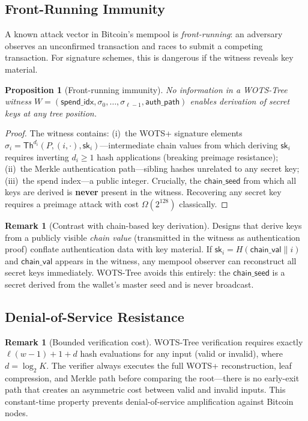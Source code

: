 \documentclass[11pt,a4paper]{article}
\newtheorem{proposition}[theorem]{Proposition}
\theoremstyle{definition}
\newtheorem{remark}[theorem]{Remark}
\begin{document}
\subsection{Front-Running Immunity}
\label{sec:front-running}

A known attack vector in Bitcoin's mempool is \emph{front-running}: an adversary observes an unconfirmed transaction and races to submit a competing transaction. For signature schemes, this is dangerous if the witness reveals key material.

\begin{proposition}[Front-running immunity]
\label{prop:front-running}
No information in a WOTS-Tree witness $W = (\mathsf{spend\_idx}, \sigma_0, \ldots, \sigma_{\ell-1}, \mathsf{auth\_path})$ enables derivation of secret keys at any tree position.
\end{proposition}

\begin{proof}
The witness contains: (i)~the WOTS+ signature elements $\sigma_i = \mathsf{Th}^{d_i}(P, (i, \cdot), \mathsf{sk}_i)$---intermediate chain values from which deriving $\mathsf{sk}_i$ requires inverting $d_i \geq 1$ hash applications (breaking preimage resistance); (ii)~the Merkle authentication path---sibling hashes unrelated to any secret key; (iii)~the spend index---a public integer. Crucially, the $\mathsf{chain\_seed}$ from which all keys are derived is \textbf{never} present in the witness. Recovering any secret key requires a preimage attack with cost $\Omega(2^{128})$ classically.
\end{proof}

\begin{remark}[Contrast with chain-based key derivation]
Designs that derive keys from a publicly visible \emph{chain value} (transmitted in the witness as authentication proof) conflate authentication data with key material. If $\mathsf{sk}_i = H(\mathsf{chain\_val} \| i)$ and $\mathsf{chain\_val}$ appears in the witness, any mempool observer can reconstruct all secret keys immediately. WOTS-Tree avoids this entirely: the $\mathsf{chain\_seed}$ is a secret derived from the wallet's master seed and is never broadcast.
\end{remark}

\subsection{Denial-of-Service Resistance}
\label{sec:dos}

\begin{remark}[Bounded verification cost]
WOTS-Tree verification requires exactly $\ell(w-1) + 1 + d$ hash evaluations for any input (valid or invalid), where $d = \log_2 K$. The verifier always executes the full WOTS+ reconstruction, leaf compression, and Merkle path before comparing the root---there is no early-exit path that creates an asymmetric cost between valid and invalid inputs. This constant-time property prevents denial-of-service amplification against Bitcoin nodes.
\end{remark}
\end{document}
